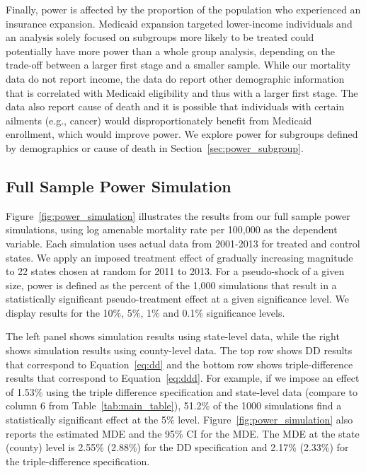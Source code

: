 \documentclass[12pt]{article}%
\begin{document}
Finally, power is affected by the proportion of the population who experienced an insurance expansion. 
Medicaid expansion targeted lower-income individuals and an analysis solely focused on subgroups more likely to be treated could potentially have more power than a whole group analysis, depending on the trade-off between a larger first stage and a smaller sample. 
While our mortality data do not report income, the data do report other demographic information that is correlated with Medicaid eligibility and thus with a larger first stage. 
The data also report cause of death and it is possible that individuals with certain ailments (e.g., cancer) would disproportionately benefit from Medicaid enrollment, which would improve power. 
We explore power for subgroups defined by demographics or cause of death in Section~\ref{sec:power_subgroup}. 

\subsection{Full Sample Power Simulation}\label{sec:power-full-results}
 
Figure~\ref{fig:power_simulation} illustrates the results from our full sample power simulations, using  log amenable mortality rate per 100,000 as the dependent variable. 
Each simulation uses actual data from 2001-2013 for  treated and control states. 
We apply an imposed treatment effect of gradually increasing magnitude to 22 states chosen at random for 2011 to 2013. 
For a pseudo-shock of a given size, power is defined as the percent of the 1,000 simulations that result in a statistically significant pseudo-treatment effect at a given significance level. 
We display results for the 10\%, 5\%, 1\% and 0.1\% significance levels. 

The left panel shows simulation results using state-level data, while the right shows simulation results using county-level data.
The top row shows DD results that correspond to Equation~\ref{eq:dd} and the bottom row shows triple-difference results that correspond to Equation~\ref{eq:ddd}. 
For example, if we impose an effect of 1.53\% using the triple difference specification and state-level data (compare to column 6 from Table~\ref{tab:main_table}), 51.2\% of the 1000 simulations find a statistically significant effect at the 5\% level. 
Figure~\ref{fig:power_simulation} also reports the estimated MDE and the 95\% CI for the MDE. The MDE at the state (county) level is 2.55\% (2.88\%) for the DD specification and 2.17\% (2.33\%) for the triple-difference specification.   
\end{document}
